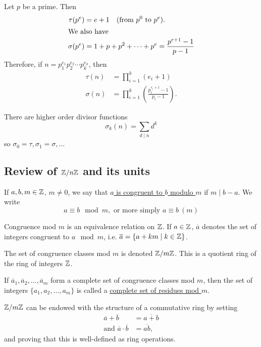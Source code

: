 Let $p$ be a prime. Then
\begin{align*}
    \tau(p^e)   & = e + 1\quad  \text{(from $p^0$ to $p^e$)}.          \\
    \intertext{We also have}
    \sigma(p^e) & = 1 + p + p^2 + \cdots + p^e = \frac{p^{e+1}-1}{p-1}
\end{align*}
Therefore, if $n=p_1^{e_1}p_2^{e_2}\cdots p_k^{e_k}$, then
\begin{align*}
    \tau(n)   & = \prod_{i=1}^k (e_i + 1)                                 \\
    \sigma(n) & = \prod_{i=1}^k \left(\frac{p_i^{e_i+1}-1}{p_i-1}\right).
\end{align*}
\begin{remark}
    There are higher order divisor functions
    \[\sigma_k(n) = \sum_{d\mid n}d^k\]
    so $\sigma_0 = \tau, \sigma_1 = \sigma, \dots$
\end{remark}

\subsection{Review of \texorpdfstring{$\mathbb Z/n\mathbb Z$}{Z/nZ} and its units}

\begin{definition}
    If $a, b, m\in \mathbb Z$, $m\neq 0$, we say that \ul{$a$ is congruent to $b$ modulo $m$} if $m\mid b-a$. We write
    \begin{equation*}
        a\equiv b\mod{m}, \text{ or more simply } a\equiv b\ (m)
    \end{equation*}
\end{definition}
Congruence mod $m$ is an equivalence relation on $\mathbb Z$. If $a\in \mathbb Z$, $\overline{a}$ denotes the set of integers congruent to $a\mod m$, i.e. $\overline{a} = \{a + km \mid k\in \mathbb Z\}$.

\begin{definition}
    The set of congruence classes mod $m$ is denoted $\mathbb Z/m\mathbb Z$. This is a quotient ring of the ring of integers $\mathbb Z$.

    If $\overline{a}_1, \overline{a}_2, \dots, \overline{a}_m$ form a complete set of congruence classes mod $m$, then the set of integers $\{a_1, a_2, \dots, a_m\}$ is called a \ul{complete set of residues mod $m$}.
\end{definition}

$\mathbb Z/m\mathbb Z$ can be endowed with the structure of a commutative ring by setting
\begin{align*}
    \overline{a} + \overline{b}               & = \overline{a + b} \\
    \text{and }\overline{a}\cdot \overline{b} & = \overline{ab},
\end{align*}
and proving that this is well-defined as ring operations.

